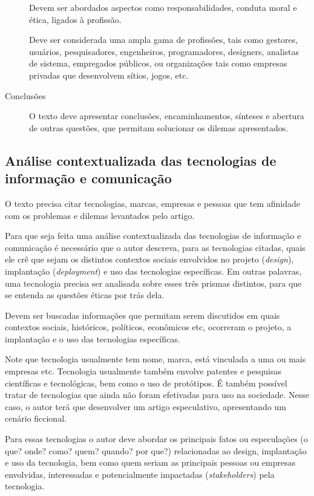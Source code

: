 \documentclass[12pt]{article}
\begin{document}
\begin{description}
		Devem ser abordados aspectos como responsabilidades, conduta moral e ética, ligados à profissão.

		Deve ser considerada uma ampla gama de profissões, tais como gestores, usuários, pesquisadores, engenheiros, programadores, designers, analistas de sistema, empregados públicos, ou organizações tais como empresas privadas que desenvolvem sítios, jogos, etc.
		\item [Conclusões] O texto deve apresentar conclusões, encaminhamentos, sínteses e abertura de outras questões, que permitam solucionar os dilemas apresentados.

	\end{description}

	\subsection{\label{tecno}Análise contextualizada das tecnologias de informação e comunicação}

	O texto precisa citar tecnologias, marcas, empresas e pessoas que tem afinidade com os problemas e dilemas levantados pelo artigo.

	Para que seja feita uma análise contextualizada das tecnologias de informação e comunicação é necessário que o autor descreva, para as tecnologias citadas, quais ele crê que sejam os distintos contextos sociais envolvidos no projeto (\textit{design}), implantação (\textit{deployment}) e uso das tecnologias específicas. Em outras palavras, uma tecnologia precisa ser analisada sobre esses três prismas distintos, para que se entenda as questões éticas por trás dela.

	Devem ser buscadas informações que permitam serem discutidos em quais contextos sociais, históricos, políticos, econômicos etc, ocorreram o projeto, a implantação e o uso das tecnologias específicas.

	Note que tecnologia usualmente tem nome, marca, está vinculada a uma ou mais empresas etc. Tecnologia usualmente também envolve patentes e pesquisas científicas e tecnológicas, bem como o uso de protótipos. É também possível tratar de tecnologias que ainda não foram efetivadas para uso na sociedade. Nesse caso, o autor terá que desenvolver um artigo especulativo, apresentando um cenário ficcional.

	Para essas tecnologias o autor deve abordar os principais fatos ou especulações (o que? onde? como? quem? quando? por que?) relacionadas ao design, implantação e uso da tecnologia, bem como quem seriam as principais pessoas ou empresas envolvidas, interessadas e potencialmente impactadas (\textit{stakeholders}) pela tecnologia.
\end{document}
